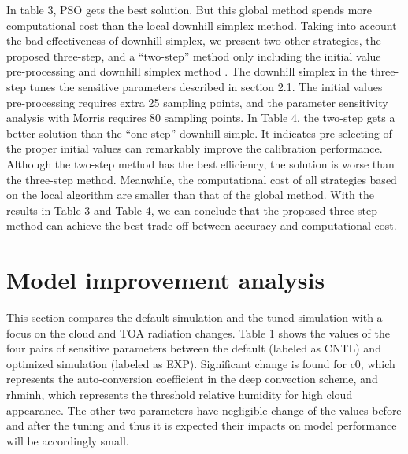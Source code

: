 \documentclass[gmd, manuscript]{copernicus}
\begin{document}
In table 3, PSO gets the best solution. But this global method spends more computational cost than the local downhill simplex method. Taking into account the bad effectiveness of downhill simplex, we present two other strategies, the proposed three-step, and a ``two-step'' method only including the initial value pre-processing and downhill simplex method . The downhill simplex in the three-step tunes the sensitive parameters described in section 2.1. The initial values pre-processing requires extra 25 sampling points, and the parameter sensitivity analysis with Morris requires 80 sampling points. In Table 4, the two-step gets a better solution than the ``one-step'' downhill simple. It indicates pre-selecting of the proper initial values can remarkably improve the calibration performance. Although the two-step method has the best efficiency, the solution is worse than the three-step method. Meanwhile, the computational cost of all strategies based on the local algorithm are smaller than that of the global method. With the results in Table 3 and Table 4, we can conclude that the proposed three-step method can achieve the best trade-off between accuracy and computational cost.


\section{Model improvement analysis}
This section compares the default simulation and the tuned simulation with a focus on the cloud and TOA radiation changes. Table 1 shows the values of the four pairs of sensitive parameters between the default (labeled as CNTL) and optimized simulation (labeled as EXP). Significant change is found for c0, which represents the auto-conversion coefficient in the deep convection scheme, and rhminh, which represents the threshold relative humidity for high cloud appearance. The other two parameters have negligible change of the values before and after the tuning and thus it is expected their impacts on model performance will be accordingly small.
\end{document}
